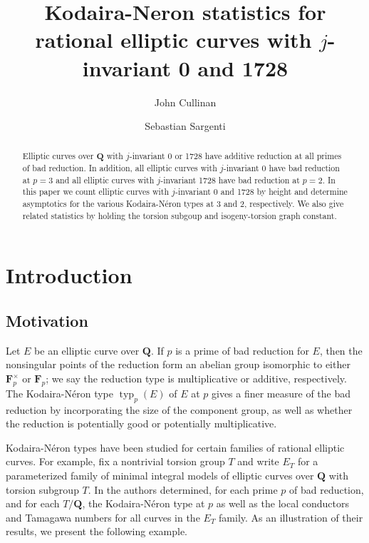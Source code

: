 \documentclass{amsart}
\newcommand{\F}{\mathbf{F}}
\newcommand{\Q}{\mathbf{Q}}
\DeclareMathOperator{\typ}{{typ}}
\numberwithin{equation}{section}
\theoremstyle{plain}
\theoremstyle{remark}
\begin{document}
\title[Kodaira-Neron Statistics]{Kodaira-Neron statistics for rational elliptic curves with $j$-invariant 0 and 1728}

\author{John Cullinan}
\address{Department of Mathematics, Bard College, Annandale-On-Hudson, NY 12504, USA}


\author{Sebastian Sargenti}
\address{Department of Mathematics, Bard College, Annandale-On-Hudson, NY 12504, USA}


\begin{abstract}
Elliptic curves over $\Q$ with $j$-invariant 0 or 1728 have additive reduction at all primes of bad reduction. In addition, all elliptic curves with $j$-invariant 0 have bad reduction at $p=3$ and all elliptic curves with $j$-invariant 1728 have bad reduction at $p=2$.   In this paper we count elliptic curves with $j$-invariant 0 and 1728 by height and determine asymptotics for the various Kodaira-N\'eron types at 3 and 2, respectively.  We also give related statistics by holding the torsion subgoup and isogeny-torsion graph constant. 
\end{abstract}



\maketitle

\section{Introduction}

\subsection{Motivation} Let $E$ be an elliptic curve over $\Q$.  If $p$ is a prime of bad reduction for $E$, then the nonsingular points of the reduction form an abelian group isomorphic to either $\F_p^\times$ or $\F_p$; we say the reduction type is multiplicative or additive, respectively.   The Kodaira-N\'eron type $\typ_p(E)$ of $E$ at $p$ gives a finer measure of the bad reduction by incorporating the size of the component group, as well as whether the reduction is potentially good or potentially multiplicative.  

Kodaira-N\'eron types have been studied for certain families of rational elliptic curves.  For example, fix a nontrivial torsion group $T$ and write $E_T$ for a parameterized family of minimal integral models of elliptic curves over $\Q$ with torsion subgroup $T$.  In \cite{br} the authors determined, for each prime $p$ of bad reduction, and for each $T/\Q$, the Kodaira-N\'eron type at $p$ as well as the local conductors and Tamagawa numbers for all curves in the $E_T$ family.  As an illustration of their results, we present the following example.
\end{document}
